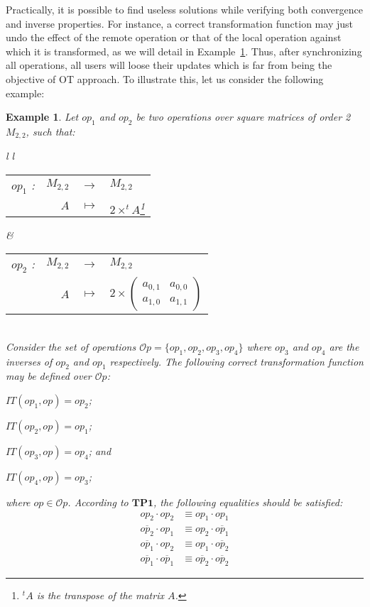 \documentclass[submission,copyright,creativecommons]{eptcs}
\newtheorem{example}{Example}
\begin{document}
Practically,    it is possible to find   useless solutions  while verifying both convergence and inverse properties. For instance, a correct transformation function may  just  undo the effect of the remote operation or that of the local operation against which it is transformed, as we will detail in  Example~\ref{ex:casBizarre}. Thus, after synchronizing all operations, all users will loose their updates which is far from being the objective of OT approach. To illustrate this, let us consider the following example:   
\begin{example}\label{ex:casBizarre}
Let $op_1 $ and $op_2$ be two  operations over square matrices of order 2 $M_{2,2}$, such that:\\
\begin{tabular}{l l}
\begin{tabular}{r r r l}
$op_1$ :  &$M_{2,2}$ &$\rightarrow$ &$M_{2,2}$\\
&$A$ &$\mapsto$ &$2 \times ^tA$\footnote{$^tA$ is the transpose of the matrix $A$.}\\
\end{tabular}&
\begin{tabular}{r r r l}
$op_2$ :&$M_{2,2}$ &$\rightarrow$ &$M_{2,2}$\\
&$A$ &$\mapsto$ &$ 2\times \begin{pmatrix}
a_{0,1}&a_{0,0} \\
a_{1,0}&a_{1,1}
\end{pmatrix}$\\ 
\end{tabular}
\end{tabular}\\
 
Consider the set of operations $\mathcal{O}p=\{op_1,op_2, op_3,op_4\}$ where $op_3$ and $op_4$ are the inverses of $op_2$ and $op_1$ respectively. The following correct transformation function may be defined over $\mathcal{O}p$:\begin{inparaenum}[(i)]
\item $IT(op_1,op)=op_2$;  \item $IT(op_2,op)=op_1$;
\item $IT(op_3,op)=op_4$; and  \item $IT(op_4,op)=op_3$;
\end{inparaenum} where $op \in \mathcal{O}p$.
According to $\mathbf{TP1}$, the following equalities should be satisfied:\vspace{-.2cm} 
\begin{align}
             op_2 \cdot op_2&\equiv  op_1 \cdot op_1 \\
             \overline{op_2} \cdot op_1&\equiv  op_2 \cdot \overline{op_1} \\
             \overline{op_1} \cdot op_2&\equiv  op_1 \cdot \overline{op_2} \\
             \overline{op_1} \cdot \overline{op_1} &\equiv  \overline{op_2} \cdot \overline{op_2}  
        \end{align}



\end{example}
\end{document}
